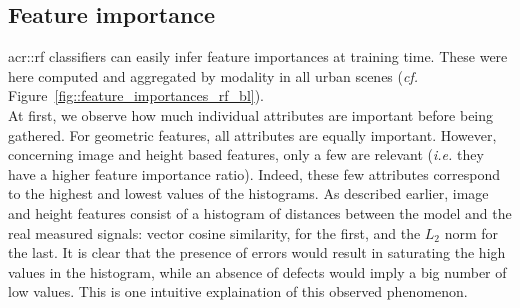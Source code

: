     \subsection{Feature importance}
        \label{subsec::experiments::baseline_feature_analysis::feature_importance}
        \begin{figure}[htpb]
            \centering
        \end{figure}
        
        \gls{acr::rf} classifiers can easily infer feature importances at training time.
        These were here computed and aggregated by modality in all urban scenes (\textit{cf.} Figure~\ref{fig::feature_importances_rf_bl}).\\

        At first, we observe how much individual attributes are important before being gathered.
        For geometric features, all attributes are equally important.
        However, concerning image and height based features, only a few are relevant (\textit{i.e.} they have a higher feature importance ratio).
        Indeed, these few attributes correspond to the highest and lowest values of the histograms.
        As described earlier, image and height features consist of a histogram of distances between the model and the real measured signals:
        vector cosine similarity, for the first, and the \(L_2\) norm for the last.
        It is clear that the presence of errors would result in saturating the high values in the histogram, while an absence of defects would imply a big number of low values.
        This is one intuitive explaination of this observed phenomenon.\\
        
